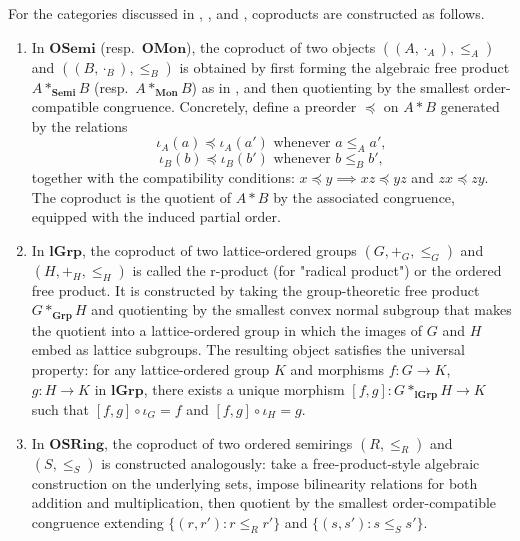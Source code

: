 \begin{proposition} \label{proposition:coproducts_in_ordered_algebraic_categories_and_semirings}
For the categories discussed in , , and , coproducts are constructed as follows.

\begin{enumerate}
    \item [\textbf{(OSemi, OMon)}] In $\mathbf{OSemi}$ (resp.\ $\mathbf{OMon}$), the coproduct of two objects $((A, \cdot_A), \leq_A)$ and $((B, \cdot_B), \leq_B)$ is obtained by first forming the algebraic free product $A *_{\mathbf{Semi}} B$ (resp.\ $A *_{\mathbf{Mon}} B$) as in , and then quotienting by the smallest order-compatible congruence. Concretely, define a preorder $\preceq$ on $A * B$ generated by the relations
    $$\iota_A(a) \preceq \iota_A(a') \text{ whenever } a \leq_A a',$$
    $$\iota_B(b) \preceq \iota_B(b') \text{ whenever } b \leq_B b',$$
    together with the compatibility conditions: $x \preceq y \implies xz \preceq yz$ and $zx \preceq zy$. The coproduct is the quotient of $A * B$ by the associated congruence, equipped with the induced partial order.

    \item [\textbf{(lGrp)}] In $\mathbf{lGrp}$, the coproduct of two lattice-ordered groups $(G, +_G, \leq_G)$ and $(H, +_H, \leq_H)$ is called the r-product (for "radical product") or the ordered free product. It is constructed by taking the group-theoretic free product $G *_{\mathbf{Grp}} H$ and quotienting by the smallest convex normal subgroup that makes the quotient into a lattice-ordered group in which the images of $G$ and $H$ embed as lattice subgroups. The resulting object satisfies the universal property: for any lattice-ordered group $K$ and morphisms $f : G \to K$, $g : H \to K$ in $\mathbf{lGrp}$, there exists a unique morphism $[f, g] : G *_{\mathbf{lGrp}} H \to K$ such that $[f, g] \circ \iota_G = f$ and $[f, g] \circ \iota_H = g$.

    \item [\textbf{(OSRing)}] In $\mathbf{OSRing}$, the coproduct of two ordered semirings $(R, \leq_R)$ and $(S, \leq_S)$ is constructed analogously: take a free-product-style algebraic construction on the underlying sets, impose bilinearity relations for both addition and multiplication, then quotient by the smallest order-compatible congruence extending $\{(r, r') : r \leq_R r'\}$ and $\{(s, s') : s \leq_S s'\}$.


\end{enumerate}
\end{proposition}
